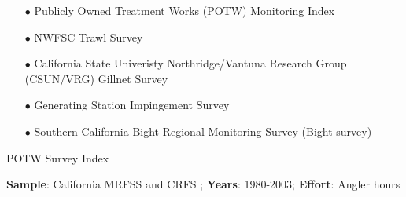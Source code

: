 \documentclass[ignorenonframetext,compress]{beamer}
\begin{document}
\begin{itemize}
\item[$\bullet$] Publicly Owned Treatment Works (POTW) Monitoring Index
\item[$\bullet$] NWFSC Trawl Survey 
\item[$\bullet$] California State Univeristy Northridge/Vantuna Research Group (CSUN/VRG) Gillnet Survey
\item[$\bullet$] Generating Station Impingement Survey
\item[$\bullet$] Southern California Bight Regional Monitoring Survey (Bight survey)
\end{itemize}

\begin{frame}{POTW Survey Index}

\textbf{Sample}: California MRFSS and CRFS ; \textbf{Years}: 1980-2003;
\textbf{Effort}: Angler hours

\begin{table}[ht]
\centering
{}
\end{table}

\end{frame}
\end{document}
